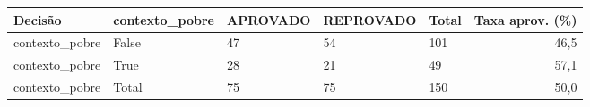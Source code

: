 \begin{tabular}{lllllr}
\toprule
Decisão & contexto\_pobre & APROVADO & REPROVADO & Total & Taxa aprov. (\%) \\
\midrule
contexto\_pobre & False & 47 & 54 & 101 & 46,5 \\
contexto\_pobre & True & 28 & 21 & 49 & 57,1 \\
contexto\_pobre & Total & 75 & 75 & 150 & 50,0 \\
\bottomrule
\end{tabular}
